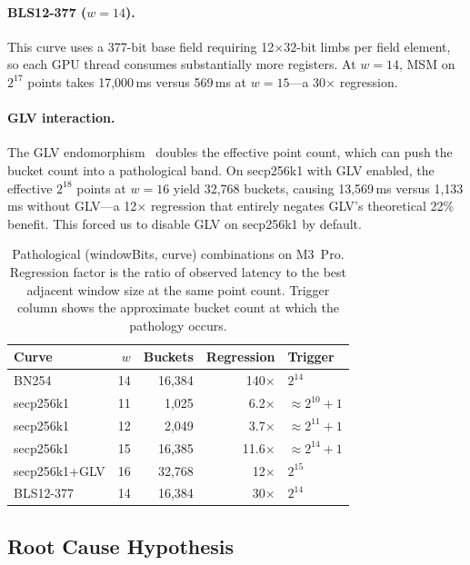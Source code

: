\paragraph{BLS12-377 ($w{=}14$).}
This curve uses a 377-bit base field requiring 12$\times$32-bit limbs per field
element, so each GPU thread consumes substantially more registers. At $w{=}14$,
MSM on $2^{17}$ points takes 17{,}000\,ms versus 569\,ms at $w{=}15$---a
30$\times$ regression.

\paragraph{GLV interaction.}
The GLV endomorphism~\cite{gallant-lambert-vanstone} doubles the effective point
count, which can push the bucket count into a pathological band. On secp256k1
with GLV enabled, the effective $2^{18}$ points at $w{=}16$ yield 32{,}768
buckets, causing 13{,}569\,ms versus 1{,}133\,ms without GLV---a 12$\times$
regression that entirely negates GLV's theoretical 22\% benefit. This forced us
to disable GLV on secp256k1 by default.

\begin{table}[t]
\centering
\small
\begin{tabular}{lrrrl}
\toprule
\textbf{Curve} & $w$ & \textbf{Buckets} & \textbf{Regression} & \textbf{Trigger} \\
\midrule
BN254     & 14 & 16{,}384  & 140$\times$ & $2^{14}$ \\
secp256k1 & 11 & 1{,}025   & 6.2$\times$ & $\approx 2^{10}{+}1$ \\
secp256k1 & 12 & 2{,}049   & 3.7$\times$ & $\approx 2^{11}{+}1$ \\
secp256k1 & 15 & 16{,}385  & 11.6$\times$ & $\approx 2^{14}{+}1$ \\
secp256k1+GLV & 16 & 32{,}768 & 12$\times$ & $2^{15}$ \\
BLS12-377 & 14 & 16{,}384  & 30$\times$  & $2^{14}$ \\
\bottomrule
\end{tabular}
\caption{Pathological (windowBits, curve) combinations on M3~Pro.
  Regression factor is the ratio of observed latency to the best adjacent
  window size at the same point count. Trigger column shows the approximate
  bucket count at which the pathology occurs.}
\label{tab:pathological}
\end{table}

\subsection{Root Cause Hypothesis}

